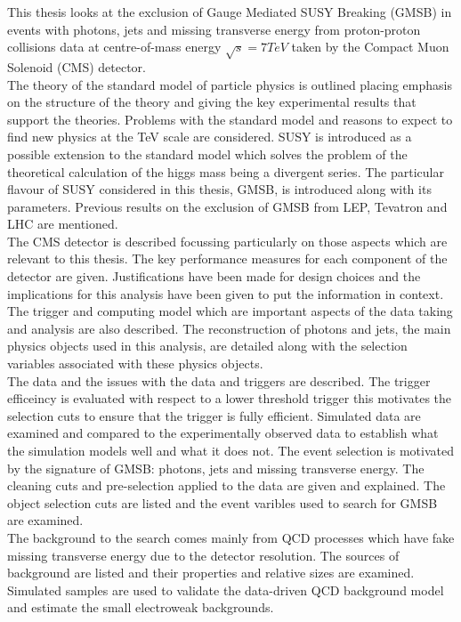 This thesis looks at the exclusion of Gauge Mediated SUSY Breaking (GMSB) in
events with photons, jets and missing transverse energy from proton-proton
collisions data at centre-of-mass energy $\sqrt{s}=7\unit{TeV}$ taken by the
Compact Muon Solenoid (CMS) detector. \\

The theory of the standard model of particle physics is outlined placing
emphasis on the structure of the theory and giving the key experimental results
that support the theories. Problems with the standard model and reasons to 
expect to find new physics at the TeV scale are considered. SUSY is introduced 
as a possible extension to the standard model which solves the problem of the 
theoretical calculation of the higgs mass being a divergent series. The 
particular flavour of SUSY considered in this thesis, GMSB, is introduced along 
with its parameters. Previous results on the exclusion of GMSB from LEP, 
Tevatron and LHC are mentioned. \\

The CMS detector is described focussing particularly on those aspects which are
relevant to this thesis. The key performance measures for each component of the
detector are given. Justifications have been made for design choices and the 
implications for this analysis have been given to put the information in 
context. The trigger and computing model which are important aspects of the data
taking and analysis are also described. The reconstruction of photons and jets,
the main physics objects used in this analysis, are detailed along with the
selection variables associated with these physics objects. \\

The data and the issues with the data and triggers are described. The trigger
efficeincy is evaluated with respect to a lower threshold trigger this motivates
the selection cuts to ensure that the trigger is fully efficient. Simulated data 
are examined and compared to the experimentally observed data to establish what 
the simulation models well and what it does not. The event selection is 
motivated by the signature of GMSB: photons, jets and missing transverse energy. 
The cleaning cuts and pre-selection applied to the data are given and explained. 
The object selection cuts are listed and the event varibles used to search for 
GMSB are examined. \\

The background to the search comes mainly from QCD processes which have fake
missing transverse energy due to the detector resolution. The sources of 
background are listed and their properties and relative sizes are examined.
Simulated samples are used to validate the data-driven QCD background model and
estimate the small electroweak backgrounds. \\

